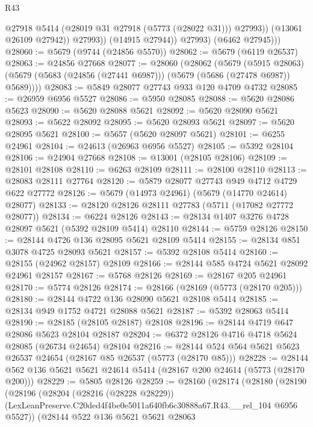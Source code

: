 \begin{lexlean}{R43}
\begin{coremodule}
                      @27918
                      @5414
                      (@28019 @31 @27918 (@5773 (@28022 @31)))
                      @27993))
                  (@13061 @26109 @27942))
                @27993))
            (@14915 @27944))
          @27993)
        (@6462 @27945)))
@28060 := @5679 (@9744 (@24856 @5570))
@28062 := @5679 (@6119 @26537)
@28063 := @24856 @27668
@28077 := @28060
    (@28062
      (@5679
        (@5915 @28063)
        (@5679 (@5683 (@24856 (@27441 @6987))) (@5679 (@5686 (@27478 @6987)) @5689))))
@28083 := @5849 @28077 @27743 @933 @120 @4709 @4732
@28085 := @26959 @6956 @5527
@28086 := @5950 @28085
@28088 := @5620 @28086 @5623
@28090 := @5620 @28088 @5621
@28092 := @5620 @28090 @5621
@28093 := @5622 @28092
@28095 := @5620 @28093 @5621
@28097 := @5620 @28095 @5621
@28100 := @5657 (@5620 @28097 @5621)
@28101 := @6255 @24961
@28104 := @24613 (@26963 @6956 @5527)
@28105 := @5392 @28104
@28106 := @24904 @27668
@28108 := @13001 (@28105 @28106)
@28109 := @28101 @28108
@28110 := @6263 @28109
@28111 := @28100 @28110
@28113 := @28083 @28111 @27764
@28120 := @5879 @28077 @27743 @949 @4712 @4729 @622 @27772
@28126 := @5679 (@14973 @24961) (@5679 (@14770 @24614) @28077)
@28133 := @28120 @28126 @28111 @27783 (@5711 (@17082 @27772 @28077))
@28134 := @6224 @28126
@28143 := @28134 @1407 @3276 @4728 @28097 @5621 (@5392 @28109 @5414) @28110
@28144 := @5759 @28126
@28150 := @28144 @4726 @136 @28095 @5621 @28109 @5414
@28155 := @28134 @851 @3078 @4725 @28093 @5621
@28157 := @5392 @28108 @5414
@28160 := @28155 (@24962 @28157) @28109
@28166 := @28144 @585 @4724 @5621 @28092 @24961 @28157
@28167 := @5768 @28126
@28169 := @28167 @205 @24961
@28170 := @5774 @28126
@28174 := @28166 (@28169 (@5773 (@28170 @205)))
@28180 := @28144 @4722 @136 @28090 @5621 @28108 @5414
@28185 := @28134 @949 @1752 @4721 @28088 @5621
@28187 := @5392 @28063 @5414
@28190 := @28185 (@28105 @28187) @28108
@28196 := @28144 @4719 @647 @28086 @5623 @28104 @28187
@28204 := @6372 @28126 @4716 @4718 @5624 @28085 (@26734 @24654) @28104
@28216 := @28144 @524 @564 @5621 @5623 @26537 @24654 (@28167 @85 @26537 (@5773 (@28170 @85)))
@28228 := @28144 @562 @136 @5621 @5621 @24614 @5414 (@28167 @200 @24614 (@5773 (@28170 @200)))
@28229 := @5805 @28126
@28259 := @28160
    (@28174
      (@28180
        (@28190
          (@28196
            (@28204
              (@28216 (@28228 @28229))
              (LexLeanPreserve.C20ded4f4be0e5011a640fb6c30888a67.R43.__rel_104 @6956 @5527))
            (@28144
              @522
              @136
              @5621
              @5621
              @28063

\end{coremodule}
\end{lexlean}
